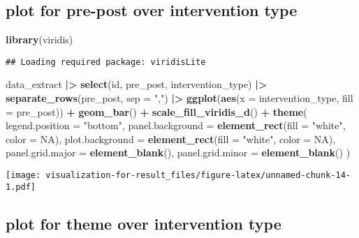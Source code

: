 \documentclass[
]{article}
\newenvironment{Shaded}{\begin{snugshade}}{\end{snugshade}}
\newcommand{\AttributeTok}[1]{\textcolor[rgb]{0.13,0.29,0.53}{#1}}
\newcommand{\ConstantTok}[1]{\textcolor[rgb]{0.56,0.35,0.01}{#1}}
\newcommand{\FunctionTok}[1]{\textcolor[rgb]{0.13,0.29,0.53}{\textbf{#1}}}
\newcommand{\NormalTok}[1]{#1}
\newcommand{\SpecialCharTok}[1]{\textcolor[rgb]{0.81,0.36,0.00}{\textbf{#1}}}
\newcommand{\StringTok}[1]{\textcolor[rgb]{0.31,0.60,0.02}{#1}}
\begin{document}
\subsection{plot for pre-post over intervention
type}\label{plot-for-pre-post-over-intervention-type}

\begin{Shaded}
\begin{Highlighting}[]
\FunctionTok{library}\NormalTok{(viridis)}
\end{Highlighting}
\end{Shaded}

\begin{verbatim}
## Loading required package: viridisLite
\end{verbatim}

\begin{Shaded}
\begin{Highlighting}[]
\NormalTok{data\_extract }\SpecialCharTok{|\textgreater{}}
  \FunctionTok{select}\NormalTok{(id, pre\_post, intervention\_type) }\SpecialCharTok{|\textgreater{}}
  \FunctionTok{separate\_rows}\NormalTok{(pre\_post, }\AttributeTok{sep =} \StringTok{","}\NormalTok{) }\SpecialCharTok{|\textgreater{}}
  \FunctionTok{ggplot}\NormalTok{(}\FunctionTok{aes}\NormalTok{(}\AttributeTok{x =}\NormalTok{ intervention\_type, }\AttributeTok{fill =}\NormalTok{ pre\_post)) }\SpecialCharTok{+}
  \FunctionTok{geom\_bar}\NormalTok{() }\SpecialCharTok{+}
  \FunctionTok{scale\_fill\_viridis\_d}\NormalTok{() }\SpecialCharTok{+}
  \FunctionTok{theme}\NormalTok{(}
      \AttributeTok{legend.position =} \StringTok{"bottom"}\NormalTok{,}
      \AttributeTok{panel.background =} \FunctionTok{element\_rect}\NormalTok{(}\AttributeTok{fill =} \StringTok{"white"}\NormalTok{, }\AttributeTok{color =} \ConstantTok{NA}\NormalTok{),}
      \AttributeTok{plot.background =} \FunctionTok{element\_rect}\NormalTok{(}\AttributeTok{fill =} \StringTok{"white"}\NormalTok{, }\AttributeTok{color =} \ConstantTok{NA}\NormalTok{),}
      \AttributeTok{panel.grid.major =} \FunctionTok{element\_blank}\NormalTok{(),}
      \AttributeTok{panel.grid.minor =} \FunctionTok{element\_blank}\NormalTok{()}
\NormalTok{    )}
\end{Highlighting}
\end{Shaded}

\texttt{[image: visualization-for-result\_files/figure-latex/unnamed-chunk-14-1.pdf]}

\subsection{plot for theme over intervention
type}\label{plot-for-theme-over-intervention-type}
\end{document}
